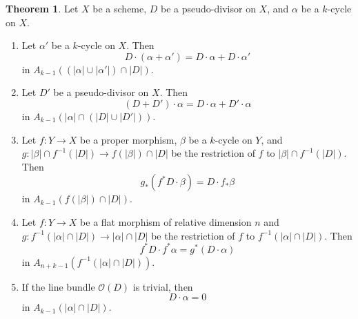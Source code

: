 \documentclass[12pt]{article}
\theoremstyle{definition}
\theoremstyle{theorem}
\newtheorem{thm}[defn]{Theorem}
\renewcommand{\O}{\mathcal O}
\newcommand{\1}{\mathbbm 1}
\begin{document}
\begin{thm} \label{properties}
Let $X$ be a scheme, $D$ be a pseudo-divisor on $X$, and $\alpha$ be a $k$-cycle on $X$.
\begin{enumerate}[{{\em(\hspace{-1pt}}}a{\em)}]
\item Let $\alpha'$ be a $k$-cycle on $X$. Then \[ D \cdot (\alpha + \alpha') = D \cdot \alpha + D \cdot \alpha' \] in $A_{k-1} ((|\alpha| \cup |\alpha'|) \cap |D|)$.
\item Let $D'$ be a pseudo-divisor on $X$. Then \[ (D + D') \cdot \alpha = D \cdot \alpha + D' \cdot \alpha \] in $A_{k-1}(|\alpha| \cap (|D| \cup |D'|))$.
\item Let $f: Y \to X$ be a proper morphism, $\beta$ be a $k$-cycle on $Y$, and $g: |\beta| \cap f^{-1}(|D|) \to f(|\beta|) \cap |D|$ be the restriction of $f$ to $|\beta| \cap f^{-1}(|D|)$. Then \[ g_* (f^* D \cdot \beta) = D \cdot f_* \beta \] in $A_{k-1}(f(|\beta|) \cap |D|)$.
\item Let $f: Y \to X$ be a flat morphism of relative dimension $n$ and $g: f^{-1}(|\alpha| \cap |D|) \to |\alpha| \cap |D|$ be the restriction of $f$ to $f^{-1}(|\alpha| \cap |D|)$. Then \[ f^* D \cdot f^* \alpha = g^* (D \cdot \alpha) \] in $A_{n+k-1}(f^{-1}(|\alpha| \cap |D|))$.
\item If the line bundle $\O(D)$ is trivial, then \[ D \cdot \alpha = 0 \] in $A_{k-1}(|\alpha| \cap |D|)$.
\end{enumerate}
\end{thm}
\end{document}
